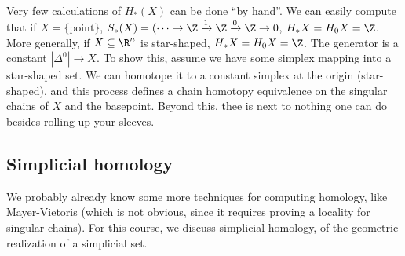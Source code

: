     Very few calculations of $H_*(X)$ can be done ``by hand''. We can easily compute that if $X= \{ \text{point} \} $, $S_*(X)= (\cdots \to \Z \xrightarrow 1\Z \xrightarrow 0\Z \to 0$, $H_*X=H_0X=\Z$. More generally, if $X \subseteq \R^n $ is star-shaped, $H_*X=H_0X=\Z$. The generator is a constant $|\Delta ^0|\to X$. To show this, assume we have some simplex mapping into a star-shaped set. We can homotope it to a constant simplex at the origin (star-shaped), and this process defines a chain homotopy equivalence on the singular chains of $X $ and the basepoint. Beyond this, thee is next to nothing one can do besides rolling up your sleeves.

    \subsection{Simplicial homology}
    We probably already know some more techniques for computing homology, like Mayer-Vietoris (which is not obvious, since it requires proving a locality for singular chains). For this course, we discuss simplicial homology, of the  geometric realization of a simplicial set.

